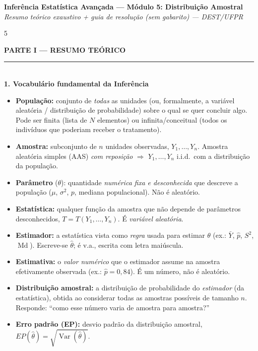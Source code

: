 \documentclass[a4paper,8pt]{extarticle}
\newcommand{\tit}[1]{\vspace{2pt}\textcolor{azul}{\rule{\linewidth}{0.6pt}}\\[1pt]\textbf{\textcolor{azul}{#1}}\\[1pt]}
\newcommand{\Var}{\operatorname{Var}}
\newcommand{\Med}{\operatorname{Md}}
\begin{document}
\raggedright
\footnotesize

\begin{center}
{\normalsize\bfseries\color{azul} Inferência Estatística Avançada — Módulo 5: Distribuição Amostral}\\[1pt]
{\scriptsize\itshape Resumo teórico exaustivo + guia de resolução (sem gabarito) — DEST/UFPR}
\end{center}
\vspace{-4pt}

\begin{multicols*}{5}
\scriptsize

\begin{center}\colorbox{cinza}{\parbox{0.94\linewidth}{\centering\bfseries\color{azul} PARTE I — RESUMO TEÓRICO}}\end{center}

\tit{1. Vocabulário fundamental da Inferência}
\begin{itemize}
\item \textbf{População:} conjunto de \emph{todas} as unidades (ou, formalmente, a variável aleatória / distribuição de probabilidade) sobre o qual se quer concluir algo. Pode ser finita (lista de $N$ elementos) ou infinita/conceitual (todos os indivíduos que poderiam receber o tratamento).
\item \textbf{Amostra:} subconjunto de $n$ unidades observadas, $Y_1,\dots,Y_n$. Amostra aleatória simples (AAS) \emph{com reposição} $\Rightarrow$ $Y_1,\dots,Y_n$ i.i.d.\ com a distribuição da população.
\item \textbf{Parâmetro} ($\theta$): quantidade \emph{numérica fixa e desconhecida} que descreve a população ($\mu$, $\sigma^2$, $p$, mediana populacional). Não é aleatório.
\item \textbf{Estatística:} qualquer função da amostra que não depende de parâmetros desconhecidos, $T=T(Y_1,\dots,Y_n)$. É \emph{variável aleatória}.
\item \textbf{Estimador:} a estatística vista como \emph{regra} usada para estimar $\theta$ (ex.: $\bar Y$, $\hat p$, $S^2$, $\Med$). Escreve-se $\hat\theta$; é v.a., escrita com letra maiúscula.
\item \textbf{Estimativa:} o \emph{valor numérico} que o estimador assume na amostra efetivamente observada (ex.: $\hat p=0{,}84$). É um número, não é aleatório.
\item \textbf{Distribuição amostral:} a distribuição de probabilidade do \emph{estimador} (da estatística), obtida ao considerar todas as amostras possíveis de tamanho $n$. Responde: “como esse número varia de amostra para amostra?”
\item \textbf{Erro padrão (EP):} desvio padrão da distribuição amostral, $EP(\hat\theta)=\sqrt{\Var(\hat\theta)}$.
\end{itemize}


\end{multicols*}
\end{document}
